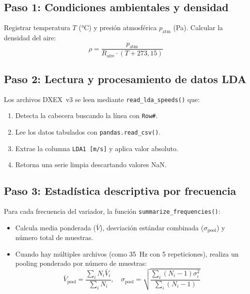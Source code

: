 \documentclass[12pt,a4paper]{article}
\begin{document}
\subsection{Paso 1: Condiciones ambientales y densidad}

Registrar temperatura $T$ (\si{\degreeCelsius}) y presión atmosférica
$p_\mathrm{atm}$ (\si{\pascal}).  Calcular la densidad del aire:
\begin{equation}
	\rho = \frac{p_\mathrm{atm}}{R_\mathrm{aire} \cdot (T + 273{,}15)}
	\label{eq:rho_calc}
\end{equation}

\subsection{Paso 2: Lectura y procesamiento de datos LDA}

Los archivos DXEX~v3 se leen mediante \texttt{read\_lda\_speeds()} que:
\begin{enumerate}
	\item Detecta la cabecera buscando la línea con \texttt{Row\#}.
	\item Lee los datos tabulados con \texttt{pandas.read\_csv()}.
	\item Extrae la columna \texttt{LDA1 [m/s]} y aplica valor absoluto.
	\item Retorna una serie limpia descartando valores NaN.
\end{enumerate}

\subsection{Paso 3: Estadística descriptiva por frecuencia}

Para cada frecuencia del variador, la función \texttt{summarize\_frequencies()}:
\begin{itemize}
	\item Calcula media ponderada ($\bar{V}$), desviación estándar combinada
	      ($\sigma_\mathrm{pool}$) y número total de muestras.
	\item Cuando hay múltiples archivos (como 35~Hz con 5 repeticiones), realiza
	      un pooling ponderado por número de muestras:
	      \begin{equation}
		      \bar{V}_\mathrm{pool} = \frac{\sum_i N_i \bar{V}_i}{\sum_i N_i},
		      \quad
		      \sigma_\mathrm{pool} = \sqrt{\frac{\sum_i (N_i-1)\sigma_i^2}
			      {\sum_i (N_i-1)}}
		      \label{eq:pooled}
	      \end{equation}
\end{itemize}
\end{document}
